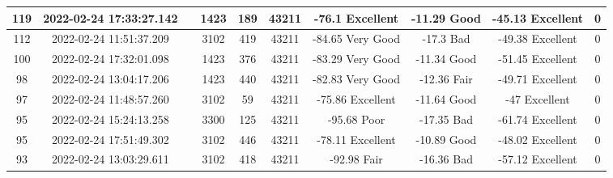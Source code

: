 \begin{longtable*}{|c|c|c|c|c|c|c|c|c|c|}
119&2022-02-24 17:33:27.142&&1423&189&43211& -76.1     Excellent   & -11.29    Good        & -45.13    Excellent   & 0\\\hline
{}112&2022-02-24 11:51:37.209&&3102&419&43211& -84.65    Very Good   & -17.3     Bad         & -49.38    Excellent   & 0\\\hline
{}100&2022-02-24 17:32:01.098&&1423&376&43211& -83.29    Very Good   & -11.34    Good        & -51.45    Excellent   & 0\\\hline
{}98&2022-02-24 13:04:17.206&&1423&440&43211& -82.83    Very Good   & -12.36    Fair        & -49.71    Excellent   & 0\\\hline
{}97&2022-02-24 11:48:57.260&&3102&59&43211& -75.86    Excellent   & -11.64    Good        & -47       Excellent   & 0\\\hline
{}95&2022-02-24 15:24:13.258&&3300&125&43211& -95.68    Poor        & -17.35    Bad         & -61.74    Excellent   & 0\\\hline
{}95&2022-02-24 17:51:49.302&&3102&446&43211& -78.11    Excellent   & -10.89    Good        & -48.02    Excellent   & 0\\\hline
{}93&2022-02-24 13:03:29.611&&3102&418&43211& -92.98    Fair        & -16.36    Bad         & -57.12    Excellent   & 0\\\hline

\end{longtable*}
